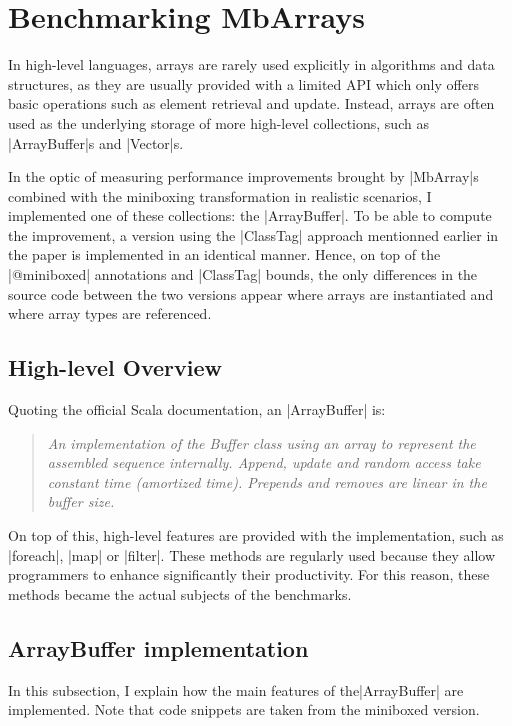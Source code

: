 \section{Benchmarking MbArrays}
\label{sec:bench}

In high-level languages, arrays are rarely used explicitly in algorithms and data structures, as they are usually provided with a limited API which only offers basic operations such as element retrieval and update. Instead, arrays are often used as the underlying storage of more high-level collections, such as |ArrayBuffer|s and |Vector|s.

In the optic of measuring performance improvements brought by |MbArray|s combined with the miniboxing transformation in realistic scenarios, I implemented one of these collections: the |ArrayBuffer|. To be able to compute the improvement, a version using the |ClassTag| approach mentionned earlier in the paper is implemented in an identical manner. Hence, on top of the |@miniboxed| annotations and |ClassTag| bounds, the only differences in the source code between the two versions appear where arrays are instantiated and where array types are referenced. 

\subsection{High-level Overview}

Quoting the official Scala documentation, an |ArrayBuffer| is: 
\begin{quote}
\textit{An implementation of the Buffer class using an array to represent the assembled sequence internally. Append, update and random access take constant time (amortized time). Prepends and removes are linear in the buffer size.} 
\end{quote}

On top of this, high-level features are provided with the implementation, such as |foreach|, |map| or |filter|. These methods are regularly used because they allow programmers to enhance significantly their productivity. For this reason, these methods became the actual subjects of the benchmarks.

\subsection{ArrayBuffer implementation}

In this subsection, I explain how the main features of the\linebreak |ArrayBuffer| are implemented. Note that code snippets are taken from the miniboxed version.

